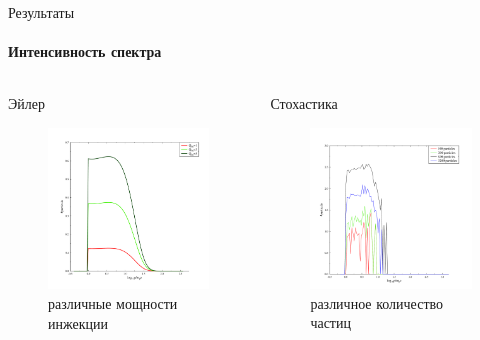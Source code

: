 \documentclass[8pt,pdf,hyperref={unicode},serif]{beamer}
\begin{document}
\begin{frame}{Результаты}
\framesubtitle{Интенсивность спектра}
\begin{columns}
\begin{column}{0.5\textwidth}
Эйлер
\begin{figure}[H]
\centering
\includegraphics[width=0.90\linewidth]{r_Qinj}
\caption{различные мощности инжекции}
\end{figure}
\end{column}

\begin{column}{0.5\textwidth}
Стохастика
\begin{figure}[H]
\centering
\includegraphics[width=0.90\linewidth]{stoh_particles}
\caption{различное количество частиц}
\end{figure}
\end{column}
\end{columns}
\end{frame}
\end{document}
